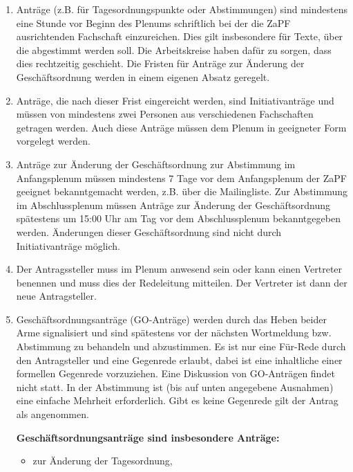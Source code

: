 \documentclass[draft,12pt,oneside]{scrreprt}
\begin{document}
\begin{enumerate}
  \item Anträge (z.B. für Tagesordnungspunkte oder Abstimmungen) sind mindestens
        eine Stunde vor Beginn des Plenums schriftlich bei der die ZaPF
        ausrichtenden Fachschaft einzureichen.
        Dies gilt insbesondere für Texte, über die abgestimmt werden soll.
        Die Arbeitskreise haben dafür zu sorgen, dass dies rechtzeitig geschieht.
        Die Fristen für Anträge zur Änderung der Geschäftsordnung werden in einem
        eigenen Absatz geregelt.

  \item Anträge, die nach dieser Frist eingereicht werden, sind Initiativanträge
        und müssen von mindestens zwei Personen aus verschiedenen Fachschaften
        getragen werden. Auch diese Anträge müssen dem Plenum in geeigneter Form
        vorgelegt werden.

  \item Anträge zur Änderung der Geschäftsordnung zur Abstimmung im Anfangsplenum
        müssen mindestens 7 Tage vor dem Anfangsplenum der ZaPF geeignet
        bekanntgemacht werden, z.B. über die Mailingliste.
        Zur Abstimmung im Abschlussplenum müssen Anträge zur Änderung der
        Geschäftsordnung spätestens um 15:00 Uhr am Tag vor dem Abschlussplenum
        bekanntgegeben werden.
        Änderungen dieser Geschäftsordnung sind nicht durch Initiativanträge möglich.

  \item Der Antragssteller muss im Plenum anwesend sein oder kann einen Vertreter
        benennen und muss dies der Redeleitung mitteilen.
        Der Vertreter ist dann der neue Antragsteller.

  \item Geschäftsordnungsanträge (GO-Anträge) werden durch das Heben beider Arme
        signalisiert und sind spätestens vor der nächsten Wortmeldung bzw.
        Abstimmung zu behandeln und abzustimmen.
        Es ist nur eine Für-Rede durch den Antragsteller und eine Gegenrede
        erlaubt, dabei ist eine inhaltliche einer formellen Gegenrede vorzuziehen.
        Eine Diskussion von GO-Anträgen findet nicht statt.
        In der Abstimmung ist (bis auf unten angegebene Ausnahmen) eine einfache
        Mehrheit erforderlich.
        Gibt es keine Gegenrede gilt der Antrag als angenommen.

    \textbf{Geschäftsordnungsanträge sind insbesondere Anträge:}
    \begin{itemize}
      \item zur Änderung der Tagesordnung,


\end{itemize}
\end{enumerate}
\end{document}

